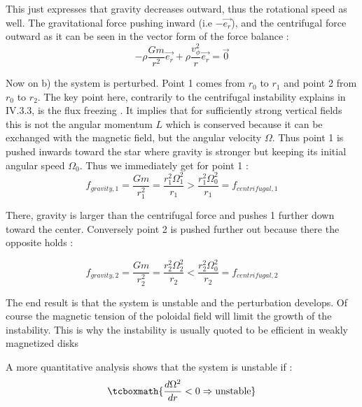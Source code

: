 \documentclass[10pt,a4paper,english]{article}
\begin{document}
This just expresses that gravity decreases outward, thus the rotational speed as well. The gravitational
force pushing inward (i.e $-\vec{e_r}$), and the centrifugal force  outward as it can be seen in the vector
form of the force balance :
\begin{equation}
    -\rho\frac{Gm}{r^2}\vec{e_r} + \rho\frac{v_{\phi}^2}{r}\vec{e_r} = \vec{0}
\end{equation}

Now  on b) the system is perturbed. Point 1 comes from $r_0$ to $r_1$ and point 2 from
$r_0$ to $r_2$. The key point here, contrarily to the centrifugal instability explains in
IV.3.3, is the flux freezing . It implies that for sufficiently strong vertical fields this is not
the angular momentum $ L$ which is conserved because it can be exchanged with the magnetic field,
but the angular velocity $\Omega$. Thus point 1 is pushed inwards toward the star where
gravity is stronger but keeping its initial angular speed $\Omega_0$. Thus we immediately get
for point 1 :
\begin{equation}
    f_{gravity,1} = \frac{Gm}{r_1^2} = \frac{r_1^2\Omega_1^2	}{r_1} >
    \frac{r_1^2\Omega_0^2}{r_1} = f_{centrifugal,1}
\end{equation}

There, gravity is larger than the centrifugal force and pushes 1 further  down toward the center.
Conversely point 2 is pushed further out because there the opposite holds :

\begin{equation}
    f_{gravity,2} = \frac{Gm}{r_2^2} = \frac{r_2^2\Omega_2^2	}{r_2} <
    \frac{r_2^2\Omega_0^2}{r_2} = f_{centrifugal,2}
\end{equation}


The end result is that the system is unstable and the perturbation develops. Of course the magnetic
tension of the poloidal field will limit the growth of the instability. This is why the instability is usually
quoted to be efficient in weakly magnetized disks

A more quantitative analysis shows that the system  is unstable if :
\begin{equation}
    \tcboxmath{\frac{d\Omega^2}{dr} < 0 \Rightarrow \text{unstable}}
\end{equation}
\end{document}
